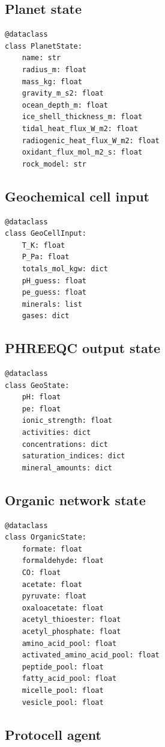 \documentclass[11pt]{article}
\begin{document}
\subsection{Planet state}

\begin{verbatim}
@dataclass
class PlanetState:
    name: str
    radius_m: float
    mass_kg: float
    gravity_m_s2: float
    ocean_depth_m: float
    ice_shell_thickness_m: float
    tidal_heat_flux_W_m2: float
    radiogenic_heat_flux_W_m2: float
    oxidant_flux_mol_m2_s: float
    rock_model: str
\end{verbatim}

\subsection{Geochemical cell input}

\begin{verbatim}
@dataclass
class GeoCellInput:
    T_K: float
    P_Pa: float
    totals_mol_kgw: dict
    pH_guess: float
    pe_guess: float
    minerals: list
    gases: dict
\end{verbatim}

\subsection{PHREEQC output state}

\begin{verbatim}
@dataclass
class GeoState:
    pH: float
    pe: float
    ionic_strength: float
    activities: dict
    concentrations: dict
    saturation_indices: dict
    mineral_amounts: dict
\end{verbatim}

\subsection{Organic network state}

\begin{verbatim}
@dataclass
class OrganicState:
    formate: float
    formaldehyde: float
    CO: float
    acetate: float
    pyruvate: float
    oxaloacetate: float
    acetyl_thioester: float
    acetyl_phosphate: float
    amino_acid_pool: float
    activated_amino_acid_pool: float
    peptide_pool: float
    fatty_acid_pool: float
    micelle_pool: float
    vesicle_pool: float
\end{verbatim}

\subsection{Protocell agent}
\end{document}
